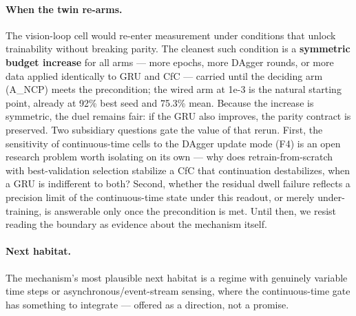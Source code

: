 \documentclass[11pt]{article}
\begin{document}
\paragraph{When the twin re-arms.} The vision-loop cell would re-enter measurement under conditions that unlock trainability without breaking parity. The cleanest such condition is a \textbf{symmetric budget increase} for all arms --- more epochs, more DAgger rounds, or more data applied identically to GRU and CfC --- carried until the deciding arm (A\_NCP) meets the precondition; the wired arm at 1e-3 is the natural starting point, already at 92\% best seed and 75.3\% mean. Because the increase is symmetric, the duel remains fair: if the GRU also improves, the parity contract is preserved. Two subsidiary questions gate the value of that rerun. First, the sensitivity of continuous-time cells to the DAgger update mode (F4) is an open research problem worth isolating on its own --- why does retrain-from-scratch with best-validation selection stabilize a CfC that continuation destabilizes, when a GRU is indifferent to both? Second, whether the residual dwell failure reflects a precision limit of the continuous-time state under this readout, or merely under-training, is answerable only once the precondition is met. Until then, we resist reading the boundary as evidence about the mechanism itself.

\paragraph{Next habitat.} The mechanism's most plausible next habitat is a regime with genuinely variable time steps or asynchronous/event-stream sensing, where the continuous-time gate has something to integrate --- offered as a direction, not a promise.
\end{document}
